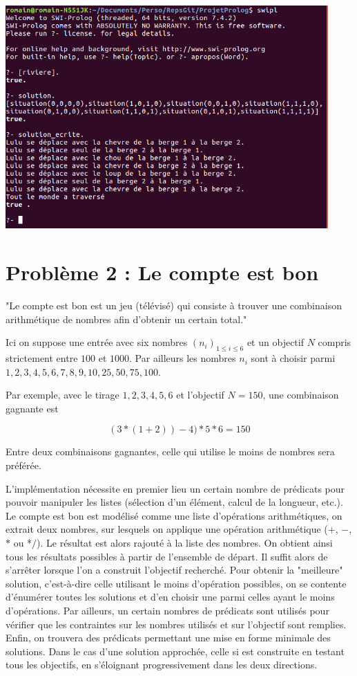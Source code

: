 \documentclass[12pt,a4paper]{article}
\begin{document}
\begin{center}
\includegraphics[width = 350pt]{SolutionRiviere.png}
\end{center}


\section{Problème 2 : Le compte est bon}
"Le compte est bon est un jeu (télévisé) qui consiste à trouver une combinaison arithmétique de nombres afin d'obtenir un certain total."

Ici on suppose une entrée avec six nombres $(n_i)_{1 \leqslant i \leqslant 6}$ et un objectif $N$ compris strictement entre $100$ et $1000$. Par ailleurs les nombres $n_i$ sont à choisir parmi $1,2,3,4,5,6,7,8,9,10,25,50,75,100$.

Par exemple, avec le tirage $1,2,3,4,5,6$ et l'objectif $N = 150$, une combinaison gagnante est 

\[ (3*(1 + 2))- 4)*5*6 = 150 \]

Entre deux combinaisons gagnantes, celle qui utilise le moins de nombres sera préférée.

L'implémentation nécessite en premier lieu un certain nombre de prédicats pour pouvoir manipuler les listes (sélection d'un élément, calcul de la longueur, etc.). Le compte est bon est modélisé comme une liste d'opérations arithmétiques, on extrait deux nombres, sur lesquels on applique une opération arithmétique ($+$, $-$, $*$ ou *$/$). Le résultat est alors rajouté à la liste des nombres. On obtient ainsi tous les résultats possibles à partir de l'ensemble de départ. Il suffit alors de s'arrêter lorsque l'on a construit l'objectif recherché. Pour obtenir la "meilleure" solution, c'est-à-dire celle utilisant le moins d'opération possibles, on se contente d'énumérer toutes les solutions et d'en choisir une parmi celles ayant le moins d'opérations. Par ailleurs, un certain nombres de prédicats sont utilisés pour vérifier que les contraintes sur les nombres utilisés et sur l'objectif sont remplies. Enfin, on trouvera des prédicats permettant une mise en forme minimale des solutions.
Dans le cas d'une solution approchée, celle si est construite en testant tous les objectifs, en s'éloignant progressivement dans les deux directions.
\end{document}
